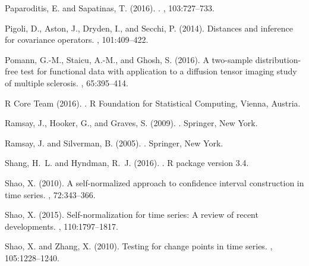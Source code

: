\documentclass[11pt]{article}
\numberwithin{equation}{section}
\numberwithin{theorem}{section}
\numberwithin{lemma}{section}
\numberwithin{proposition}{section}
\numberwithin{cor}{section}
\numberwithin{definition}{section}
\numberwithin{cons}{section}
\numberwithin{rem}{section}
\numberwithin{exa}{section}
\numberwithin{table}{section}
\numberwithin{figure}{section}
\numberwithin{algo}{section}
\begin{document}
{{\begin{thebibliography}{}
Paparoditis, E. and Sapatinas, T. (2016).
.
, 103:727--733.

Pigoli, D., Aston, J., Dryden, I., and Secchi, P. (2014).
\newblock Distances and inference for covariance operators.
, 101:409--422.

Pomann, G.-M., Staicu, A.-M., and Ghosh, S. (2016).
\newblock A two-sample distribution-free test for functional data with
  application to a diffusion tensor imaging study of multiple sclerosis.
,
  65:395--414.

{R Core Team} (2016).
.
\newblock R Foundation for Statistical Computing, Vienna, Austria.

Ramsay, J., Hooker, G., and Graves, S. (2009).
.
\newblock Springer, New York.

Ramsay, J. and Silverman, B. (2005).
.
\newblock Springer, New York.

Shang, H.~L. and Hyndman, R.~J. (2016).
.
\newblock R package version 3.4.

Shao, X. (2010).
\newblock A self-normalized approach to confidence interval construction in
  time series.
,
  72:343--366.

Shao, X. (2015).
\newblock Self-normalization for time series: A review of recent developments.
,
  110:1797--1817.

Shao, X. and Zhang, X. (2010).
\newblock Testing for change points in time series.
,
  105:1228--1240.


\end{thebibliography}}}
\end{document}
